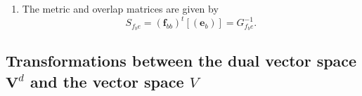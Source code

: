 \documentclass[aps,preprint]{revtex4}
\begin{document}
\begin{enumerate}
\begin{enumerate}
in terms of coordinates 
\begin{equation}
\left( 
\begin{array}{c}
\mathcal{R}_{e}\left( w_{d}\right) _{1} \\ 
\vdots \\ 
\mathcal{R}_{e}\left( w_{d}\right) _{r}%
\end{array}%
\right) =\left( 
\begin{array}{ccc}
\mathcal{R}_{e_{b}}\left( S_{f_{b}e}^{-1}\right) _{11} & \cdots & \mathcal{R}%
_{e_{b}}\left( S_{f_{b}e}^{-1}\right) _{1r} \\ 
\vdots & \ddots & \vdots \\ 
\mathcal{R}_{e_{b}}\left( S_{f_{b}e}^{-1}\right) _{r1} & \cdots & \mathcal{R}%
_{e_{b}}\left( S_{f_{b}e}^{-1}\right) _{rr}%
\end{array}%
\right) \left( 
\begin{array}{c}
\mathcal{R}_{e}\left( v\right) ^{1} \\ 
\vdots \\ 
\mathcal{R}_{e}\left( v\right) ^{r}%
\end{array}%
\right)
\end{equation}%
and \label{contravaraiant - covariant coordinate transformation} 
\begin{equation}
\mathcal{R}_{e}\left( w_{d}\right) _{j}=\sum_{1\leq k\leq r}\mathcal{R}%
_{e}\left( S_{f_{b}e}^{-1}\right) _{jk}\mathcal{R}_{e}\left( v\right)
^{k}=\sum_{1\leq k\leq r}\mathcal{R}_{e}\left( G_{f_{b}e}\right) _{jk}%
\mathcal{R}_{e}\left( v\right) ^{k},
\end{equation}%
where $G_{f_{b}e}$ is the metric operator between the bases $\left( 
\boldsymbol{f}_{b}\right) $ and $\left( \boldsymbol{e}\right) $ and is the
inverse of the overlap operator between these bases i.e.

\item The metric and overlap matrices are given by 
\begin{equation}
S_{f_{b}e}=\left( \boldsymbol{f}_{bb}\right) ^{t}\left[ \left( \boldsymbol{e}%
_{b}\right) \right] =G_{f_{b}e}^{-1}.
\end{equation}
\end{enumerate}
\end{enumerate}

\subsection{Transformations between the dual vector space $\boldsymbol{V}%
^{d} $ and the vector space $V$}
\end{document}
